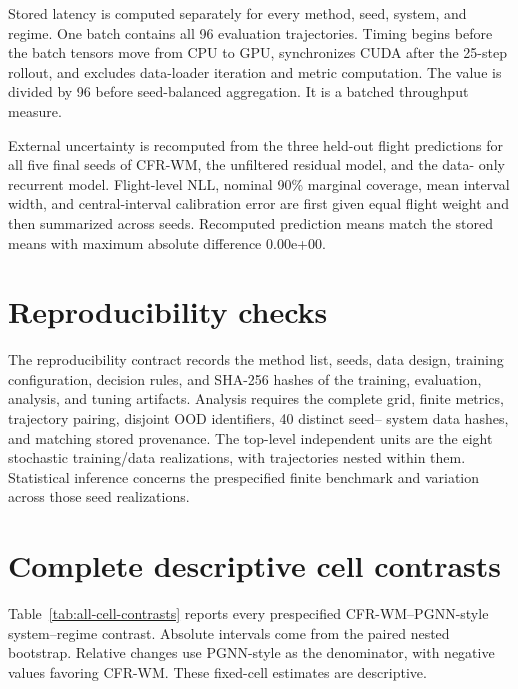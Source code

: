 \documentclass[iicol,pdflatex,sn-basic,Numbered]{sn-jnl}
\newcommand{\ExternalMeanReconstructionDifference}{0.00e+00}
\begin{document}
\begin{appendices}
Stored latency is computed separately for every method, seed, system, and
regime. One batch contains all 96 evaluation trajectories. Timing begins before
the batch tensors move from CPU to GPU, synchronizes CUDA after the 25-step
rollout, and excludes data-loader iteration and metric computation. The value
is divided by 96 before seed-balanced aggregation. It is a batched throughput
measure.

External uncertainty is recomputed from the three held-out flight predictions
for all five final seeds of CFR-WM, the unfiltered residual model, and the data-
only recurrent model. Flight-level NLL, nominal 90\% marginal coverage, mean
interval width, and central-interval calibration error are first given equal
flight weight and then summarized across seeds. Recomputed prediction means
match the stored means with maximum absolute difference
\ExternalMeanReconstructionDifference{}.

\section{Reproducibility checks}

The reproducibility contract records the method list, seeds, data design,
training configuration, decision rules, and SHA-256 hashes of the training,
evaluation, analysis, and tuning artifacts. Analysis requires the complete grid,
finite metrics, trajectory pairing, disjoint OOD identifiers, 40 distinct seed--
system data hashes, and matching stored provenance. The top-level independent
units are the eight stochastic training/data realizations, with trajectories
nested within them. Statistical inference concerns the prespecified finite
benchmark and variation across those seed realizations.

\section{Complete descriptive cell contrasts}

Table~\ref{tab:all-cell-contrasts} reports every prespecified CFR-WM--PGNN-style
system--regime contrast. Absolute intervals come from the paired nested
bootstrap. Relative changes use PGNN-style as the denominator, with negative values
favoring CFR-WM. These fixed-cell estimates are descriptive.


\end{appendices}
\end{document}

